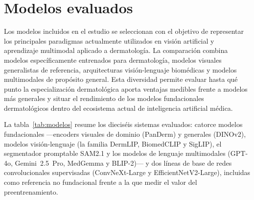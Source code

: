 \section{Modelos evaluados}
\label{sec:modelos}

Los modelos incluidos en el estudio se seleccionan con el objetivo
de representar los principales paradigmas actualmente utilizados en
visión artificial y aprendizaje multimodal aplicado a dermatología.
La comparación combina modelos específicamente entrenados para
dermatología, modelos visuales generalistas de referencia,
arquitecturas visión-lenguaje biomédicas y modelos multimodales de
propósito general. Esta diversidad permite evaluar hasta qué punto
la especialización dermatológica aporta ventajas medibles frente a
modelos más generales y situar el rendimiento de los modelos
fundacionales dermatológicos dentro del ecosistema actual de
inteligencia artificial médica.

La tabla~\ref{tab:modelos} resume los dieciséis sistemas evaluados:
catorce modelos fundacionales ---encoders visuales de dominio
(PanDerm) y generales (DINOv2), modelos visión-lenguaje (la familia
DermLIP, BiomedCLIP y SigLIP), el segmentador promptable SAM2.1 y
los modelos de lenguaje multimodales (GPT-4o, Gemini~2.5~Pro,
MedGemma y BLIP-2)--- y dos líneas de base de redes convolucionales
supervisadas (ConvNeXt-Large y EfficientNetV2-Large), incluidas como
referencia no fundacional frente a la que medir el valor del
preentrenamiento.


